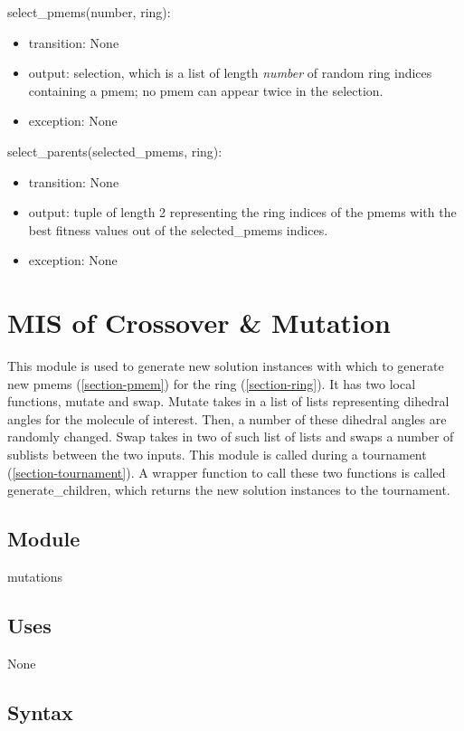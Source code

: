 \documentclass[12pt, titlepage]{article}
\begin{document}
\noindent select\_pmems(number, ring):
\begin{itemize}
	\item transition: None
	\item output: selection, which is a list of length \textit{number} of 
	random ring indices containing a pmem; no pmem can appear twice in the 
	selection.
	\item exception: None
\end{itemize}

\noindent select\_parents(selected\_pmems, ring):
\begin{itemize}
	\item transition: None
	\item output: tuple of length 2 representing the ring indices of the pmems 
	with the best fitness values out of the selected\_pmems indices.
	\item exception: None
\end{itemize}

\section{MIS of Crossover \& Mutation} \label{section-mutations}

This module is used to generate new solution instances with which to generate 
new pmems (\ref{section-pmem}) for the ring (\ref{section-ring}). It has two 
local functions, mutate and swap. Mutate takes in a list of lists representing 
dihedral angles for the molecule of interest. Then, a number of these dihedral 
angles are randomly changed. Swap takes in two of such list of lists and swaps 
a number of sublists between the two inputs. This module is called during a 
tournament (\ref{section-tournament}). A wrapper function to call these two 
functions is called generate\_children, which returns the new solution 
instances to the tournament.

\subsection{Module}

mutations

\subsection{Uses}

None

\subsection{Syntax}
\end{document}
